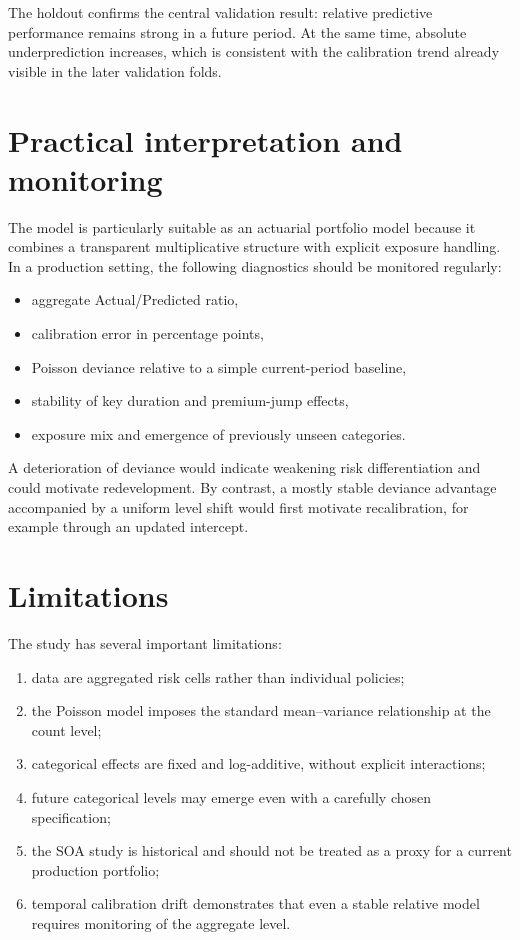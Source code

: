 \documentclass[11pt,a4paper]{article}
\theoremstyle{definition}
\begin{document}
The holdout confirms the central validation result: relative predictive performance remains strong in a future period. At the same time, absolute underprediction increases, which is consistent with the calibration trend already visible in the later validation folds.

\section{Practical interpretation and monitoring}
The model is particularly suitable as an actuarial portfolio model because it combines a transparent multiplicative structure with explicit exposure handling. In a production setting, the following diagnostics should be monitored regularly:
\begin{itemize}
\item aggregate Actual/Predicted ratio,
\item calibration error in percentage points,
\item Poisson deviance relative to a simple current-period baseline,
\item stability of key duration and premium-jump effects,
\item exposure mix and emergence of previously unseen categories.
\end{itemize}

A deterioration of deviance would indicate weakening risk differentiation and could motivate redevelopment. By contrast, a mostly stable deviance advantage accompanied by a uniform level shift would first motivate recalibration, for example through an updated intercept.

\section{Limitations}
The study has several important limitations:
\begin{enumerate}
\item data are aggregated risk cells rather than individual policies;
\item the Poisson model imposes the standard mean--variance relationship at the count level;
\item categorical effects are fixed and log-additive, without explicit interactions;
\item future categorical levels may emerge even with a carefully chosen specification;
\item the SOA study is historical and should not be treated as a proxy for a current production portfolio;
\item temporal calibration drift demonstrates that even a stable relative model requires monitoring of the aggregate level.
\end{enumerate}
\end{document}
